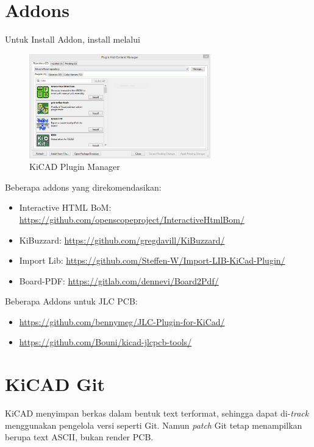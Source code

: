\documentclass[12pt]{book}
\begin{document}
	\section{Addons}
	
	Untuk Install Addon, install melalui 
	
	\begin{figure}[!ht]
		\centering
		\includegraphics[width=0.7\textwidth]{images/kicad/kicadpcm}
		\caption{KiCAD Plugin Manager}
	\end{figure}
	
	Beberapa addons yang direkomendasikan:
	
	\begin{itemize}
		\item Interactive HTML BoM: \url{https://github.com/openscopeproject/InteractiveHtmlBom/}
		\item KiBuzzard: \url{https://github.com/gregdavill/KiBuzzard/}
		\item Import Lib: \url{https://github.com/Steffen-W/Import-LIB-KiCad-Plugin/}
		\item Board-PDF: \url{https://gitlab.com/dennevi/Board2Pdf/}
	\end{itemize}
	
	Beberapa Addons untuk JLC PCB:
	
	\begin{itemize}
		\item \url{https://github.com/bennymeg/JLC-Plugin-for-KiCad/}
		\item \url{https://github.com/Bouni/kicad-jlcpcb-tools/}
	\end{itemize}
	
	\section{KiCAD Git}
	
	KiCAD menyimpan berkas dalam bentuk text terformat, sehingga dapat di-\textit{track} menggunakan pengelola versi seperti Git.
	Namun \textit{patch} Git tetap menampilkan berupa text ASCII, bukan render PCB.
	
\end{document}
